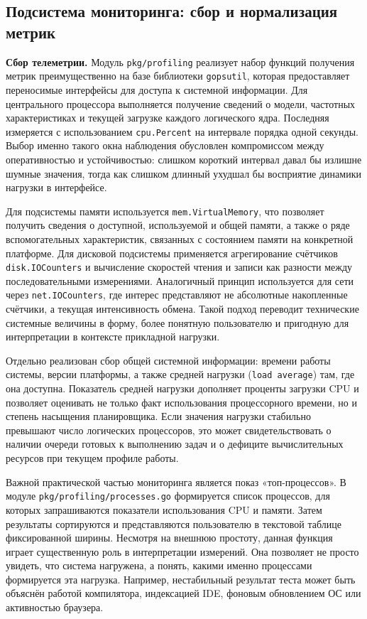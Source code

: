 \subsection{Подсистема мониторинга: сбор и нормализация метрик}

\textbf{Сбор телеметрии.} Модуль \texttt{pkg/profiling} реализует набор функций получения метрик преимущественно на базе библиотеки \texttt{gopsutil}, которая предоставляет переносимые интерфейсы для доступа к системной информации. Для центрального процессора выполняется получение сведений о модели, частотных характеристиках и текущей загрузке каждого логического ядра. Последняя измеряется с использованием \texttt{cpu.Percent} на интервале порядка одной секунды. Выбор именно такого окна наблюдения обусловлен компромиссом между оперативностью и устойчивостью: слишком короткий интервал давал бы излишне шумные значения, тогда как слишком длинный ухудшал бы восприятие динамики нагрузки в интерфейсе.

Для подсистемы памяти используется \texttt{mem.VirtualMemory}, что позволяет получить сведения о доступной, используемой и общей памяти, а также о ряде вспомогательных характеристик, связанных с состоянием памяти на конкретной платформе. Для дисковой подсистемы применяется агрегирование счётчиков \texttt{disk.IOCounters} и вычисление скоростей чтения и записи как разности между последовательными измерениями. Аналогичный принцип используется для сети через \texttt{net.IOCounters}, где интерес представляют не абсолютные накопленные счётчики, а текущая интенсивность обмена. Такой подход переводит технические системные величины в форму, более понятную пользователю и пригодную для интерпретации в контексте прикладной нагрузки.

Отдельно реализован сбор общей системной информации: времени работы системы, версии платформы, а также средней нагрузки (\texttt{load average}) там, где она доступна. Показатель средней нагрузки дополняет проценты загрузки CPU и позволяет оценивать не только факт использования процессорного времени, но и степень насыщения планировщика. Если значения нагрузки стабильно превышают число логических процессоров, это может свидетельствовать о наличии очереди готовых к выполнению задач и о дефиците вычислительных ресурсов при текущем профиле работы.

Важной практической частью мониторинга является показ «топ-процессов». В модуле \texttt{pkg/profiling/processes.go} формируется список процессов, для которых запрашиваются показатели использования CPU и памяти. Затем результаты сортируются и представляются пользователю в текстовой таблице фиксированной ширины. Несмотря на внешнюю простоту, данная функция играет существенную роль в интерпретации измерений. Она позволяет не просто увидеть, что система нагружена, а понять, какими именно процессами формируется эта нагрузка. Например, нестабильный результат теста может быть объяснён работой компилятора, индексацией IDE, фоновым обновлением ОС или активностью браузера.

